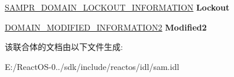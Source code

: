 \begin{DoxyCompactItemize}
\item 
\mbox{\label{union___s_a_m_p_r___d_o_m_a_i_n___i_n_f_o___b_u_f_f_e_r_a3754eef7c2be0e31bf9940fbbc15abb6}} 
\hyperlink{struct___s_a_m_p_r___d_o_m_a_i_n___l_o_c_k_o_u_t___i_n_f_o_r_m_a_t_i_o_n}{S\+A\+M\+P\+R\+\_\+\+D\+O\+M\+A\+I\+N\+\_\+\+L\+O\+C\+K\+O\+U\+T\+\_\+\+I\+N\+F\+O\+R\+M\+A\+T\+I\+ON} {\bfseries Lockout}
\item 
\mbox{\label{union___s_a_m_p_r___d_o_m_a_i_n___i_n_f_o___b_u_f_f_e_r_a8793a596236ea1c90218c7fbe8de0efb}} 
\hyperlink{struct___d_o_m_a_i_n___m_o_d_i_f_i_e_d___i_n_f_o_r_m_a_t_i_o_n2}{D\+O\+M\+A\+I\+N\+\_\+\+M\+O\+D\+I\+F\+I\+E\+D\+\_\+\+I\+N\+F\+O\+R\+M\+A\+T\+I\+O\+N2} {\bfseries Modified2}
\end{DoxyCompactItemize}


该联合体的文档由以下文件生成\+:\begin{DoxyCompactItemize}
\item 
E\+:/\+React\+O\+S-\/0../sdk/include/reactos/idl/sam.\+idl\end{DoxyCompactItemize}
